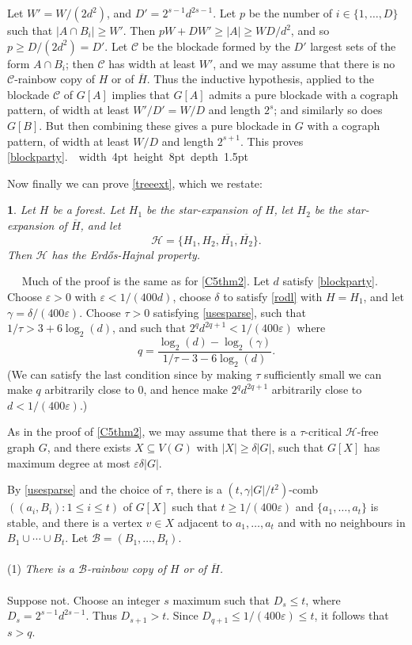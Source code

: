 \documentclass[titlepage,11pt]{article}
\newcommand\blackslug{\hbox{\hskip 1pt \vrule width 4pt height 8pt depth 1.5pt
        \hskip 1pt}}
\newcommand\bbox{\hfill \quad \blackslug \bigbreak}
\def\ll{,\ldots,}
\def\cupcup{\cup\cdots\cup}
\newcommand{\vare}{\varepsilon}
\newtheorem{thm}{}[section]
\newcommand{\Proof}{\noindent{\bf Proof.}\ \ }
\begin{document}
Let $W'=W/(2d^2)$, and $D'=2^{s-1}d^{2s-1}$. 
Let $p$ be the number of $i\in \{1\ll D\}$ such that $|A\cap B_i|\ge W'$. Then 
$pW+DW'\ge |A|\ge WD/d^2$, and so $p\ge D/(2d^2)=D'$. Let $\mathcal{C}$ be the blockade formed by the $D'$
largest sets of the form $A\cap B_i$; then $\mathcal{C}$ has width at least $W'$, and we may assume that
there is no $\mathcal{C}$-rainbow copy of 
$H$ or of $\overline{H}$. Thus the inductive hypothesis, applied to the blockade $\mathcal{C}$ of $G[A]$
implies that $G[A]$ admits a 
pure blockade with a cograph pattern, of width at least $W'/D'=W/D$ and length $2^s$; and similarly so does $G[B]$.
But then combining these gives a pure blockade in $G$ with a cograph pattern, of width at least $W/D$ and length $2^{s+1}$.
This proves \ref{blockparty}.~\bbox

Now finally we can prove \ref{treeext}, which we restate:
\begin{thm}\label{treeext2}
Let $H$ be a forest. Let $H_1$ be the star-expansion of $H$, let $H_2$
be the star-expansion of $\overline{H}$, and let 
$$\mathcal{H}=\{H_1,H_2,\overline{H_1},\overline{H_2}\}.$$
Then $\mathcal{H}$ has the Erd\H os-Hajnal property.
\end{thm}
\Proof
Much of the proof is the same as for \ref{C5thm2}.
Let $d$ satisfy \ref{blockparty}.
Choose $\vare>0$ with $\vare <1/(400d)$,
choose $\delta$ to satisfy \ref{rodl} with $H=H_1$, and let $\gamma=\delta/(400\vare)$.
Choose $\tau>0$ satisfying \ref{usesparse}, such that $1/\tau>3+6\log_2(d)$, and such that
$2^{q}d^{2q+1}<1/(400\vare)$  where
$$q=\frac{\log_2(d)-\log_2(\gamma)}{1/\tau-3-6\log_2(d)}.$$
(We can satisfy the last condition since by making $\tau$ sufficiently small we can make $q$ arbitrarily close to $0$,
and hence make $2^{q}d^{2q+1}$ arbitrarily close to $d< 1/(400\vare)$.)




As in the proof of \ref{C5thm2}, we may assume that there is a $\tau$-critical $\mathcal{H}$-free graph $G$,
and there exists $X\subseteq V(G)$
with $|X|\ge \delta|G|$, such that $G[X]$ has maximum degree at most $\vare\delta|G|$.

By \ref{usesparse} and the choice of $\tau$,
there is
a $(t,\gamma|G|/t^2)$-comb $((a_i,B_i):1\le i\le t)$ of $G[X]$ such that $t\ge 1/(400\vare)$ and $\{a_1\ll a_t\}$ is stable, and
there is a vertex $v\in X$ adjacent to $a_1\ll a_t$ and with
no neighbours in $B_1\cupcup B_t$.
Let $\mathcal{B}=(B_1\ll B_t)$. 
\\
\\
(1) {\em There is a $\mathcal{B}$-rainbow copy of $H$ or of $\overline{H}$.}
\\
\\
Suppose not. Choose an integer $s$ maximum such that $D_s\le t$, where $D_s=2^{s-1}d^{2s-1}$. 
Thus $D_{s+1}>t$. Since $D_{q+1}\le 1/(400\vare)\le t$, it follows that $s>q$.
\end{document}
